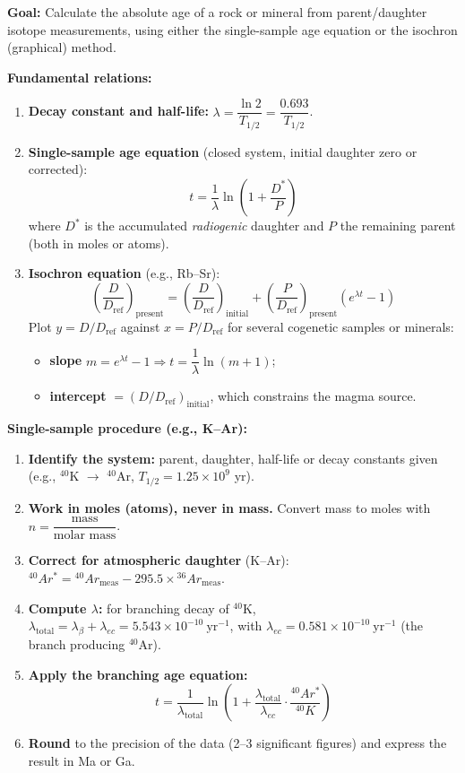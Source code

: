 \documentclass[11pt]{article}
\newcommand{\cle}[1]{{\popxbold\color{popdark}#1}}
\begin{document}
\begin{methode}
\textbf{Goal:} Calculate the absolute age of a rock or mineral from parent/daughter isotope measurements, using either the \cle{single-sample} age equation or the \cle{isochron} (graphical) method.

\textbf{Fundamental relations:}
\begin{enumerate}
    \item \textbf{Decay constant and half-life:} $\lambda = \dfrac{\ln 2}{T_{1/2}} = \dfrac{0.693}{T_{1/2}}$.
    \item \textbf{Single-sample age equation} (closed system, initial daughter zero or corrected):
    \[ t = \frac{1}{\lambda} \ln \left( 1 + \frac{D^*}{P} \right) \]
    where $D^*$ is the accumulated \emph{radiogenic} daughter and $P$ the remaining parent (both in moles or atoms).
    \item \textbf{Isochron equation} (e.g., Rb--Sr):
    \[ \left(\frac{D}{D_{\mathrm{ref}}}\right)_{\text{present}} = \left(\frac{D}{D_{\mathrm{ref}}}\right)_{\text{initial}} + \left(\frac{P}{D_{\mathrm{ref}}}\right)_{\text{present}} \left(e^{\lambda t} - 1\right) \]
    Plot $y = D/D_{\mathrm{ref}}$ against $x = P/D_{\mathrm{ref}}$ for several cogenetic samples or minerals:
    \begin{itemize}
        \item \textbf{slope} $m = e^{\lambda t} - 1 \Rightarrow t = \dfrac{1}{\lambda}\ln(m+1)$;
        \item \textbf{intercept} $= (D/D_{\mathrm{ref}})_{\text{initial}}$, which constrains the magma source.
    \end{itemize}
\end{enumerate}

\textbf{Single-sample procedure (e.g., K--Ar):}
\begin{enumerate}
    \item \textbf{Identify the system:} parent, daughter, half-life or decay constants given (e.g., $^{40}$K $\rightarrow$ $^{40}$Ar, $T_{1/2} = 1.25 \times 10^{9}$ yr).
    \item \textbf{Work in moles (atoms), never in mass.} Convert mass to moles with $n = \dfrac{\text{mass}}{\text{molar mass}}$.
    \item \textbf{Correct for atmospheric daughter} (K--Ar): $^{40}Ar^{*} = {}^{40}Ar_{\text{meas}} - 295.5 \times {}^{36}Ar_{\text{meas}}$.
    \item \textbf{Compute $\lambda$:} for branching decay of $^{40}$K, $\lambda_{\text{total}} = \lambda_{\beta} + \lambda_{ec} = 5.543 \times 10^{-10}\ \mathrm{yr^{-1}}$, with $\lambda_{ec} = 0.581 \times 10^{-10}\ \mathrm{yr^{-1}}$ (the branch producing $^{40}$Ar).
    \item \textbf{Apply the branching age equation:}
    \[ t = \frac{1}{\lambda_{\text{total}}} \ln \left( 1 + \frac{\lambda_{\text{total}}}{\lambda_{ec}} \cdot \frac{{}^{40}Ar^{*}}{{}^{40}K} \right) \]
    \item \textbf{Round} to the precision of the data (2--3 significant figures) and express the result in Ma or Ga.
\end{enumerate}


\end{methode}
\end{document}
